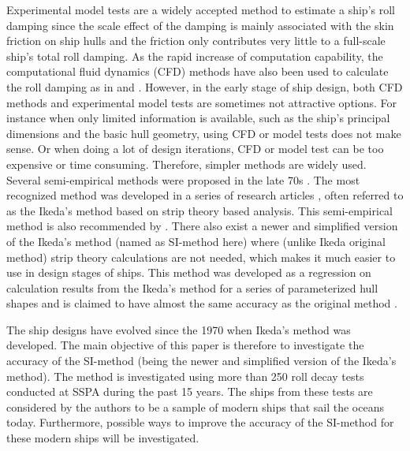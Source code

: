 Experimental model tests are a widely accepted method to estimate a ship's roll damping since the scale effect of the damping is mainly associated with the skin friction on ship hulls and the friction only contributes very little to a full-scale ship's total roll damping\parencite{imo_1200_2006}. As the rapid increase of computation capability, the computational fluid dynamics (CFD) methods have also been used to calculate the roll damping as in \parencite{kristiansen_experimental_2014} and \parencite{henry_peter_piehl_ship_2016}.  
However, in the early stage of ship design, both CFD methods and experimental model tests are sometimes not attractive options. For instance when only limited information is available, such as the ship's principal dimensions and the basic hull geometry, using CFD or model tests does not make sense. Or when doing a lot of design iterations, CFD or model test can be too expensive or time consuming. Therefore, simpler methods are widely used. 
Several semi-empirical methods were proposed in the late 70s \parencite{himeno_prediction_1981}. The most recognized method was developed in a series of research articles \parencite{ikeda_roll_1978,ikeda_eddy_1978,ikeda_roll_1979,ikeda_components_1978,ikeda_velocity_1979}, often referred to as the Ikeda's method based on strip theory based analysis. This semi-empirical method is also recommended by \parencite{ittc_ittc_2011}. 
There also exist a newer and simplified version of the Ikeda's method \parencite{kawahara_simple_2011} (named as SI-method here) where (unlike Ikeda original method) strip theory calculations are not needed, which makes it much easier to use in design stages of ships. This method was developed as a regression on calculation results from the Ikeda's method for a series of parameterized hull shapes and is claimed to have almost the same accuracy as the original method \parencite{kawahara_simple_2011}.

The ship designs have evolved since the 1970 when Ikeda's method was developed. The main objective of this paper is therefore to investigate the accuracy of the SI-method (being the newer and simplified version of the Ikeda's method). The method is investigated using more than 250 roll decay tests conducted at SSPA during the past 15 years. The ships from these tests are considered by the authors to be a sample of modern ships that sail the oceans today. Furthermore, possible ways to improve the accuracy of the SI-method for these modern ships will be investigated.

